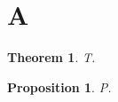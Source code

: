 \documentclass{article}
\newtheorem{theorem}{Theorem}[section]
\newtheorem{proposition}[theorem]{Proposition}
\newtheorem{proposition}{Proposition}[section]
\begin{document}
\section{A}
\begin{theorem}T.\end{theorem}
\begin{proposition}P.\end{proposition}
\end{document}
